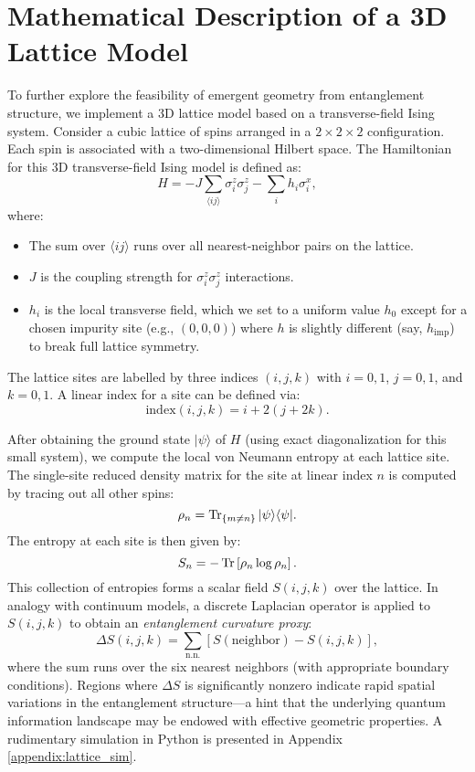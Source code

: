 \documentclass[12pt]{article}
\begin{document}
\section{Mathematical Description of a 3D Lattice Model}
To further explore the feasibility of emergent geometry from entanglement structure, we implement a 3D lattice model based on a transverse-field Ising system. Consider a cubic lattice of spins arranged in a $2\times 2 \times 2$ configuration. Each spin is associated with a two-dimensional Hilbert space. The Hamiltonian for this 3D transverse-field Ising model is defined as:
\begin{equation}
  H = -J \sum_{\langle ij \rangle} \sigma^z_i \sigma^z_j - \sum_i h_i \sigma^x_i,
\end{equation}
where:
\begin{itemize}
  \item The sum over $\langle ij \rangle$ runs over all nearest-neighbor pairs on the lattice.
  \item $J$ is the coupling strength for $\sigma^z_i \sigma^z_j$ interactions.
  \item $h_i$ is the local transverse field, which we set to a uniform value $h_0$ except for a chosen impurity site (e.g., $(0,0,0)$) where $h$ is slightly different (say, $h_{\text{imp}}$) to break full lattice symmetry.
\end{itemize}
The lattice sites are labelled by three indices $(i,j,k)$ with $i = 0,1$, $j = 0,1$, and $k = 0,1$. A linear index for a site can be defined via:
\begin{equation}
  \mathrm{index}(i,j,k) = i + 2(j + 2k).
\end{equation}

After obtaining the ground state $|\psi\rangle$ of $H$ (using exact diagonalization for this small system), we compute the local von Neumann entropy at each lattice site. The single-site reduced density matrix for the site at linear index $n$ is computed by tracing out all other spins:
\begin{equation}
  \rho_n = \Tr_{\{m\neq n\}} |\psi\rangle\langle\psi|.
\end{equation}
The entropy at each site is then given by:
\begin{equation}
  S_n = -\Tr\left[ \rho_n \log \rho_n \right].
\end{equation}
This collection of entropies forms a scalar field $S(i,j,k)$ over the lattice. In analogy with continuum models, a discrete Laplacian operator is applied to $S(i,j,k)$ to obtain an \emph{entanglement curvature proxy}:
\begin{equation}
  \Delta S(i,j,k) = \sum_{\text{n.n.}} \left[ S(\text{neighbor}) - S(i,j,k) \right],
\end{equation}
where the sum runs over the six nearest neighbors (with appropriate boundary conditions). Regions where $\Delta S$ is significantly nonzero indicate rapid spatial variations in the entanglement structure—a hint that the underlying quantum information landscape may be endowed with effective geometric properties.
A rudimentary simulation in Python is presented in Appendix \ref{appendix:lattice_sim}.
\end{document}
